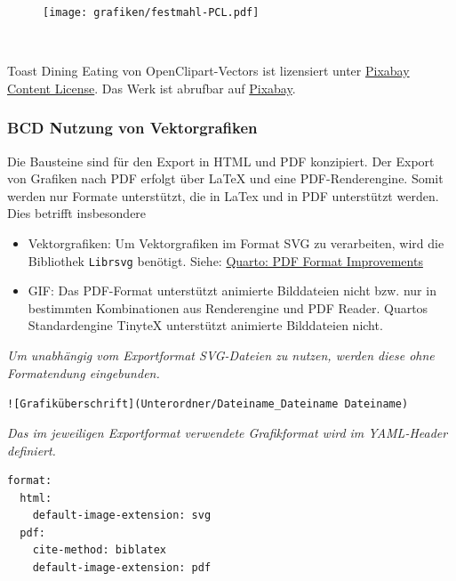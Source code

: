 \documentclass[
  letterpaper,
  DIV=11]{scrartcl}
\begin{document}
\begin{figure}[H]

{\centering \texttt{[image: grafiken/festmahl-PCL.pdf]}

}

\caption{~}

\end{figure}%

Toast Dining Eating von OpenClipart-Vectors ist lizensiert unter
\href{https://pixabay.com/service/license-summary/}{Pixabay Content
License}. Das Werk ist abrufbar auf
\href{https://pixabay.com/vectors/toast-dining-eating-event-festive-153723/}{Pixabay}.

\subsubsection{BCD Nutzung von
Vektorgrafiken}\label{bcd-nutzung-von-vektorgrafiken}

Die Bausteine sind für den Export in HTML und PDF konzipiert. Der Export
von Grafiken nach PDF erfolgt über LaTeX und eine PDF-Renderengine.
Somit werden nur Formate unterstützt, die in LaTex und in PDF
unterstützt werden. Dies betrifft insbesondere

\begin{itemize}
\item
  Vektorgrafiken: Um Vektorgrafiken im Format SVG zu verarbeiten, wird
  die Bibliothek \texttt{Librsvg} benötigt. Siehe:
  \href{https://quarto.org/docs/prerelease/1.3/pdf.html}{Quarto: PDF
  Format Improvements}
\item
  GIF: Das PDF-Format unterstützt animierte Bilddateien nicht bzw. nur
  in bestimmten Kombinationen aus Renderengine und PDF Reader. Quartos
  Standardengine TinyteX unterstützt animierte Bilddateien nicht.
\end{itemize}

\emph{Um unabhängig vom Exportformat SVG-Dateien zu nutzen, werden diese
ohne Formatendung eingebunden.}

\texttt{!{[}Grafiküberschrift{]}(Unterordner/Dateiname\_Dateiname\ Dateiname)}

\emph{Das im jeweiligen Exportformat verwendete Grafikformat wird im
YAML-Header definiert.}

\begin{verbatim}
format:
  html:
    default-image-extension: svg
  pdf:
    cite-method: biblatex
    default-image-extension: pdf
\end{verbatim}
\end{document}
